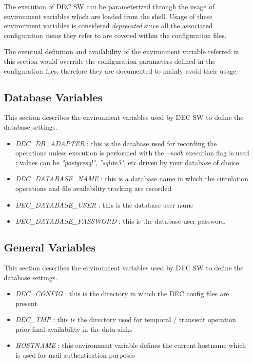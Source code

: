 \documentclass[dec_sum_main.tex]{subfiles}
\begin{document}
The execution of DEC SW can be parameterized through the usage of environment variables which are loaded from the shell. Usage of these environment variables is considered \textit{deprecated} since all the associated configuration items they refer to are covered within the configuration files.
\newline
\par
\noindent
The eventual definition and availability of the environment variable referred in this section would override the configuration parameters defined in the configuration files, therefore they are documented to mainly avoid their usage.


\subsection{Database Variables} \label{Database Variables}
This section describes the environment variables used by DEC SW to define the database settings.
\begin{itemize}
	\item \textit{DEC\_DB\_ADAPTER} : this is the database used for recording the operations unless execution is performed with the \textit{--nodb} execution flag is used ; values can be \textit{"postgresql"}, \textit{"sqlite3"}, etc driven by your database of choice 
	\item \textit{DEC\_DATABASE\_NAME} : this is a database name in which the circulation operations and file availability tracking are recorded
	\item \textit{DEC\_DATABASE\_USER} : this is the database user name
	\item \textit{DEC\_DATABASE\_PASSWORD} : this is the database user password
\end{itemize}

\subsection{General Variables} \label{General Variables}
This section describes the environment variables used by DEC SW to define the database settings.
\begin{itemize}
	\item \textit{DEC\_CONFIG} : this is the directory in which the DEC config files are present
	\item \textit{DEC\_TMP} : this is the directory used for temporal / transient operation prior final availability in the data sinks
	\item \textit{HOSTNAME} : this environment variable defines the current hostname which is used for mail authentication purposes	
\end{itemize}
\end{document}
